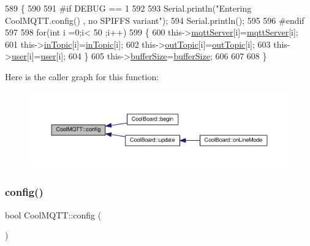 \begin{DoxyCode}
589 \{
590 
591 \textcolor{preprocessor}{#if DEBUG == 1}
592 
593     Serial.println(\textcolor{stringliteral}{"Entering CoolMQTT.config() , no SPIFFS variant"});
594     Serial.println();
595 
596 \textcolor{preprocessor}{#endif}
597 
598     \textcolor{keywordflow}{for}(\textcolor{keywordtype}{int} i =0;i< 50 ;i++)
599     \{
600         this->\hyperlink{classCoolMQTT_ab8bb951f87ddbf92db74c2ad16a3e53e}{mqttServer}[i]=\hyperlink{classCoolMQTT_ab8bb951f87ddbf92db74c2ad16a3e53e}{mqttServer}[i];
601         this->\hyperlink{classCoolMQTT_a4492f52a441e83cc5151010317fdb52d}{inTopic}[i]=\hyperlink{classCoolMQTT_a4492f52a441e83cc5151010317fdb52d}{inTopic}[i];
602         this->\hyperlink{classCoolMQTT_a109c786a17b463f9eeba046194279522}{outTopic}[i]=\hyperlink{classCoolMQTT_a109c786a17b463f9eeba046194279522}{outTopic}[i];
603         this->\hyperlink{classCoolMQTT_a8cd47e45d457f908d4b4390b35aaee83}{user}[i]=\hyperlink{classCoolMQTT_a8cd47e45d457f908d4b4390b35aaee83}{user}[i];
604     \}
605     this->\hyperlink{classCoolMQTT_a7f3cf26b51d6770f216e42c5ef13ca9f}{bufferSize}=\hyperlink{classCoolMQTT_a7f3cf26b51d6770f216e42c5ef13ca9f}{bufferSize};
606     
607 
608 \}
\end{DoxyCode}
Here is the caller graph for this function\+:\nopagebreak
\begin{figure}[H]
\begin{center}
\leavevmode
\includegraphics[width=350pt]{classCoolMQTT_a9b703de4f1358f0ee7a5e8c44979c648_icgraph}
\end{center}
\end{figure}
\mbox{\label{classCoolMQTT_a6571671781a505feca9a8a56e256c6bc}} 
\subsubsection{\texorpdfstring{config()}{config()}\hspace{0.1cm}{\footnotesize\ttfamily [2/2]}}
{\footnotesize\ttfamily bool Cool\+M\+Q\+T\+T\+::config (\begin{DoxyParamCaption}{ }\end{DoxyParamCaption})}

